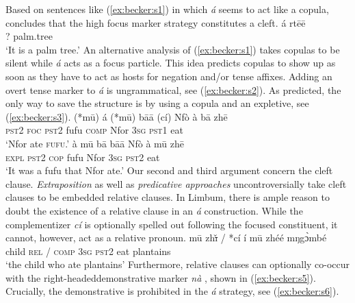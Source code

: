 \documentclass[output=paper,
modfonts
]{langscibook}
\begin{document}
Based on sentences like (\ref{ex:becker:s1}) in which \textit{\'a} seems to act like a copula, \citet[][301]{Fransen1995} concludes that the high focus marker strategy constitutes a cleft.
\ea \label{ex:becker:s1}
\gll \'a rt\=e\=e\\  
     ? palm.tree\\ 
\glt `It is a palm tree.'
\z
An alternative analysis of (\ref{ex:becker:s1}) takes copulas to be silent while \textit{\'a} acts as a focus particle. This idea predicts copulas to show up as soon as they have to act as hosts for negation and/or tense affixes. Adding an overt tense marker to \textit{\'a} is ungrammatical, see (\ref{ex:becker:s2}). As predicted, the only way to save the structure is by using a copula and an expletive, see (\ref{ex:becker:s3}).
\ea \label{ex:becker:s2}
\gll (*m\=u) \'{a} (*m\=u) b\=a\=a (c\'i) Nf\`{o} \`{a} b\=a zh\=e \\  
     \textsc{pst2} \textsc{foc} \textsc{pst2} fufu \textsc{comp} Nfor  \textsc{3sg} \textsc{pst1} eat \\ 
\glt `Nfor ate \textsc{\MakeLowercase{FUFU}}.'
\z
\ea \label{ex:becker:s3}
\gll à m\=u b\=a b\=a\=a Nf\`{o} \`{a} m\=u zh\=e \\  
     \textsc{expl} \textsc{pst2} \textsc{cop} fufu Nfor  \textsc{3sg} \textsc{pst2} eat \\ 
\glt `It was a fufu that Nfor ate.'
\z
Our second and third argument concern the cleft clause. \textit{Extraposition} \citep{Akmajian1970,Gundel1977,Percus1997} as well as \textit{predicative approaches} \citep{Svenious1998,Hedberg2000,Reeve2011} uncontroversially take cleft clauses to be embedded relative clauses. In Limbum, there is ample reason to doubt the existence of a relative clause in an {\em \'a} construction. While the complementizer \textit{c\'i} is optionally spelled out following the focused constituent, it cannot, however, act as a relative pronoun. 
\ea \label{ex:becker:s4}
\gll m\=u  {zh\sout{\v{\i}}} / *c\'i \'i m\=u zh\'e\'e mŋg\`ɔmb\'e \\  
     child \textsc{rel} / \textsc{comp} \textsc{3sg} \textsc{pst2} eat plantains \\ 
\glt `the child who ate plantains'
\z
Furthermore, relative clauses can optionally co-occur with the right-headed\linebreak demonstrative marker \textit{n\`a} \citep{Fransen1995,Mpoche1993}, shown in (\ref{ex:becker:s5}). Crucially, the demonstrative is prohibited in the \textit{\'a} strategy, see (\ref{ex:becker:s6}).
\end{document}
